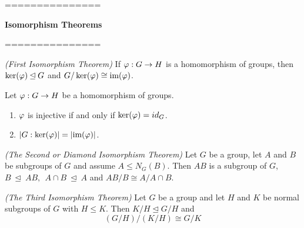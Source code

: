 ===============

\textbf{Isomorphism Theorems}

===============

\nl

\begin{thm}\textit{(First Isomorphism Theorem)}
If $\varphi:G \rightarrow H$ is a homomorphism of groups, then $\ker(\varphi)\unlhd G$ and $G/\ker(\varphi) \cong \text{im}(\varphi)$.
\end{thm}

\nl

\begin{cor}
Let $\varphi: G\rightarrow H$ be a homomorphism of groups.
\begin{enumerate}
\item $\varphi$ is injective if and only if $\ker(\varphi) = id_G$.
\item $|G:\ker(\varphi)| = |\text{im}(\varphi)|$.
\end{enumerate}
\end{cor}

\nl

\begin{thm}\textit{(The Second or Diamond Isomorphism Theorem)}
Let $G$ be a group, let $A$ and $B$ be subgroups of $G$ and assume $A\leq N_G(B)$. Then $AB$ is a subgroup of $G$, $B\ \unlhd\  AB,\ \ A\cap B\ \unlhd\  A$ and $AB/B\cong A/A\cap B$.
\end{thm}

\begin{center}
\end{center}


\begin{thm}\textit{(The Third Isomorphism Theorem)}
Let $G$ be a group and let $H$ and $K$ be normal subgroups of $G$ with $H\leq K$. Then $K/H\unlhd G/H$ and 
\[(G/H)/(K/H)\cong G/K\]
\end{thm}

\nl

